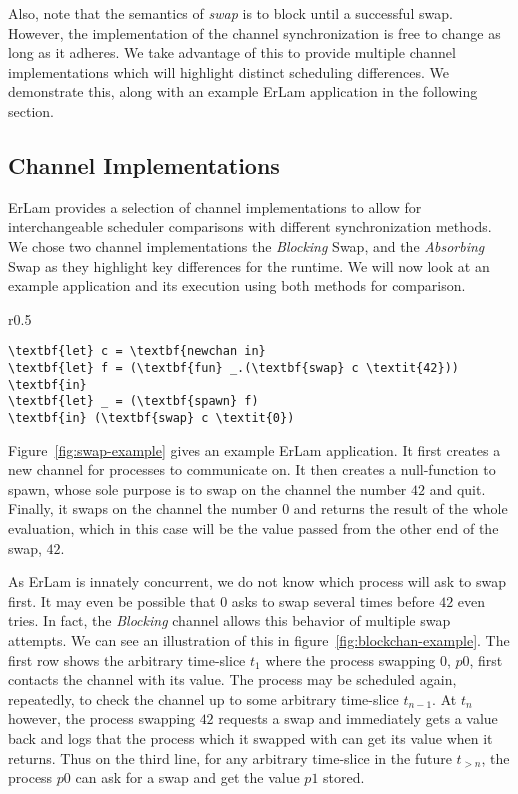 Also, note that the semantics of \emph{swap} is to block until a successful swap. 
However, the implementation of the channel synchronization is free to change as 
long as it adheres. We take advantage of this to provide multiple channel 
implementations which will highlight distinct scheduling differences. We 
demonstrate this, along with an example ErLam application in the following 
section.

\subsection{Channel Implementations}\label{sec:channel implementations}

ErLam provides a selection of channel implementations to allow for 
interchangeable scheduler comparisons with different synchronization methods.
We chose two channel implementations the 
{\sl Blocking} Swap, and the {\sl Absorbing} Swap as they highlight key differences
for the runtime. We will now look at an example application and its execution
using both methods for comparison.

\begin{wrapfigure}{r}{0.5\textwidth}
    \centering
{\footnotesize
\begin{BVerbatim}[commandchars=\\\{\}]
\textbf{let} c = \textbf{newchan in}
\textbf{let} f = (\textbf{fun} _.(\textbf{swap} c \textit{42})) \textbf{in}
\textbf{let} _ = (\textbf{spawn} f)
\textbf{in} (\textbf{swap} c \textit{0})
\end{BVerbatim}
}
    \caption{
        A simple ErLam application which swaps on a channel before returning.}
    \label{fig:swap-example}
\end{wrapfigure}

Figure~\ref{fig:swap-example} gives an example ErLam application. It first 
creates a new channel for processes to communicate on. It then creates a 
null-function to spawn, whose sole purpose is to swap on the channel the number
$42$ and quit. Finally, it swaps on the channel the number $0$ and returns
the result of the whole evaluation, which in this case will be the value passed
from the other end of the swap, $42$. 

As ErLam is innately concurrent, we do not know which process will ask to swap
first. It may even be possible that $0$ asks to swap several times before $42$
even tries. In fact, the {\sl Blocking} channel allows this behavior of 
multiple swap attempts.
We can see an illustration of this in figure~\ref{fig:blockchan-example}.
The first row shows the arbitrary time-slice $t_1$ where the process swapping $0$, 
$p0$, first contacts the channel with its value. The process may be scheduled again,
repeatedly, to check the channel up to some arbitrary time-slice $t_{n-1}$. At
$t_n$ however, the process swapping $42$ requests a swap and immediately gets a
value back and logs that the process which it swapped with can get its value
when it returns. Thus on the third line, for any arbitrary time-slice in the 
future $t_{>n}$, the process $p0$ can ask for a swap and get the value $p1$ 
stored.

